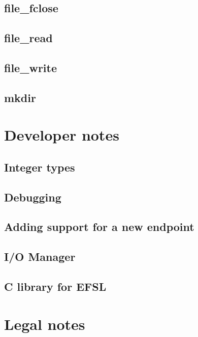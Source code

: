 \documentclass[a4paper,fleqn]{article}
\begin{document}
\subsection{file\_fclose}
	
	\newpage
\subsection{file\_read}
	
	\newpage
\subsection{file\_write}
	
	\newpage
\subsection{mkdir}
	

\newpage
\section{Developer notes}
\subsection{Integer types}
	
\subsection{Debugging}
	
\subsection{Adding support for a new endpoint}
	
\subsection{I/O Manager}
	
\subsection{C library for EFSL}
	
	
\newpage
\section{Legal notes}
	
\end{document}
